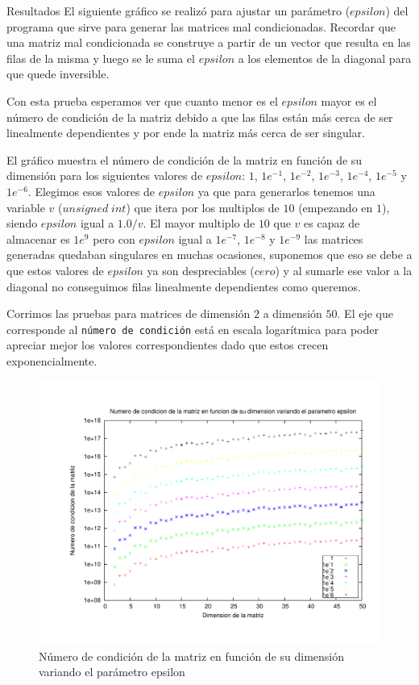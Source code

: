\begin{section}{Resultados}
	El siguiente gráfico se realizó para ajustar un parámetro ($epsilon$) del programa que sirve para generar las
	matrices mal condicionadas. Recordar que una matriz mal condicionada se construye a partir de un vector que 
	resulta en las filas de la misma y luego se le suma el $epsilon$ a los elementos de la diagonal para que quede 
	inversible.
	
	Con esta prueba esperamos ver que cuanto menor es el $epsilon$ mayor es el número de condición de la matriz
	 debido a que las filas están más cerca de ser linealmente dependientes y por ende la matriz más cerca de ser
	  singular.

	El gráfico muestra el número de condición de la matriz en función de su dimensión para los siguientes valores de
	$epsilon$: $1$, $1e^{-1}$, $1e^{-2}$, $1e^{-3}$, $1e^{-4}$, $1e^{-5}$ y $1e^{-6}$. Elegimos esos valores de
	$epsilon$ ya que para generarlos tenemos una variable $v$ ($unsigned\;int$) que itera por los multiplos de $10$ 
	(empezando en $1$),	siendo $epsilon$ igual a $1.0/v$. El mayor multiplo de $10$ que $v$ es capaz de almacenar es $1e^9$ 
	pero con $epsilon$ igual a $1e^{-7}$, $1e^{-8}$ y $1e^{-9}$ las matrices generadas quedaban singulares en muchas
	ocasiones, suponemos que eso se debe a que estos valores de $epsilon$ ya son despreciables ($cero$) y al sumarle 
	ese valor a la diagonal no conseguimos filas linealmente dependientes como queremos.
	
	Corrimos las pruebas para matrices de dimensión $2$ a dimensión $50$.
	El eje que corresponde al \texttt{número de condición} está en escala logarítmica para poder apreciar mejor los valores correspondientes dado que estos crecen exponencialmente.

	\begin{figure}[H]
	  \centering
		\includegraphics[width=14cm]{graficos/ajuste_epsilon.pdf}
	  \caption{Número de condición de la matriz en función de su dimensión variando el parámetro epsilon}
	  \label{fig:epsilon}
	\end{figure}
	

\end{section}
